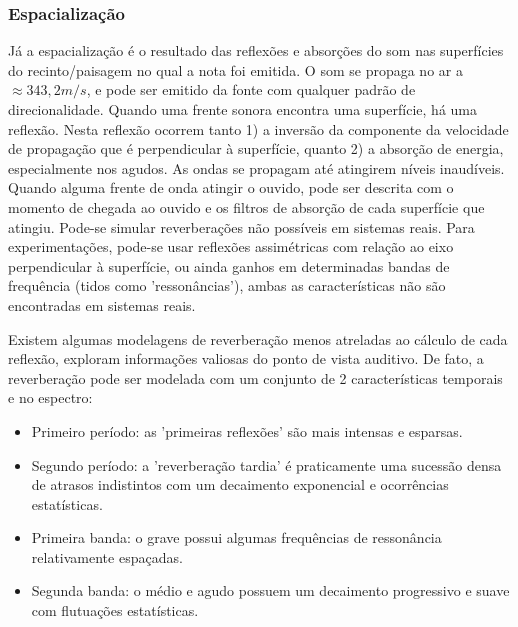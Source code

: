 \subsubsection{Espacialização}
Já a espacialização é o resultado das reflexões e absorções do som nas superfícies do recinto/paisagem no qual a nota foi emitida. O som se propaga no ar a $\approx 343,2m/s$, e pode ser emitido da fonte com qualquer padrão de direcionalidade. Quando uma frente sonora encontra uma superfície, há uma reflexão. Nesta reflexão ocorrem tanto 1) a inversão da componente da velocidade de propagação que é perpendicular à superfície, quanto 2) a absorção de energia, especialmente nos agudos. As ondas se propagam até atingirem níveis inaudíveis. Quando alguma frente de onda atingir o ouvido, pode ser descrita com o momento de chegada ao ouvido e os filtros de absorção de cada superfície que atingiu. Pode-se simular reverberações não possíveis em sistemas reais. Para experimentações, pode-se usar reflexões assimétricas com relação ao eixo perpendicular à superfície, ou ainda ganhos em determinadas bandas de frequência (tidos como 'ressonâncias'), ambas as características não são encontradas em sistemas reais.

Existem algumas modelagens de reverberação menos atreladas ao cálculo de cada reflexão, exploram informações valiosas do ponto de vista auditivo. De fato, a reverberação pode ser modelada com um conjunto de 2 características temporais e no espectro:
\begin{itemize}
    \item Primeiro período: as 'primeiras reflexões' são mais intensas e esparsas.
    \item Segundo período: a 'reverberação tardia' é praticamente uma sucessão densa de atrasos indistintos com um decaimento exponencial e ocorrências estatísticas.
    \item Primeira banda: o grave possui algumas frequências de ressonância relativamente espaçadas.
    \item Segunda banda: o médio e agudo possuem um decaimento progressivo e suave com flutuações estatísticas.
\end{itemize}

